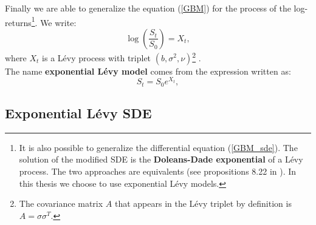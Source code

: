 Finally we are able to generalize the equation (\ref{GBM}) for the process of the log-returns\footnote{
It is also possible to generalize the differential equation (\ref{GBM_sde}). The solution of the modified SDE 
is the \textbf{Doleans-Dade exponential} of a Lévy process. The two approaches are equivalents (see propositions 8.22 in \cite{Cont}).
In this thesis we choose to use exponential Lévy models. }.
We write:
\begin{equation}
 \log \left( \frac{S_t}{S_0} \right) = X_t ,
\end{equation}
where $X_t$ is a Lévy process with triplet $(b,\sigma^2,\nu)$\footnote{The covariance matrix $A$ that appears in the Lévy
triplet by definition is $A = \sigma \sigma^T$.} .\\

The name \textbf{exponential Lévy model} comes from the expression written as: 
\begin{equation}\label{ELM}
 S_t = S_0 e^{X_t} ,
\end{equation}

\subsection{Exponential Lévy SDE}

